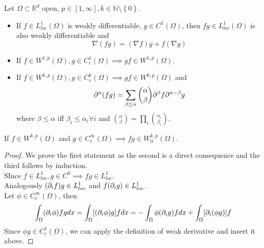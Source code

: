 \documentclass[../main.tex]{subfiles}
\begin{document}
\begin{lemma}
	Let $\Omega \subset \mathbb{R}^{d}$ open, $p \in [ 1, \infty ], k \in \mathbb{N}\setminus \left\{ 0 \right\}$.
	\begin{itemize}
	\item If $f\in L^{1}_{loc} ( \Omega) $ is weakly differentiable, $g \in C^{1}( \Omega) $, then $fg \in L^{1}_{loc} ( \Omega) $ is also weakly differentiable and 
		\[ 
		\nabla( fg) = ( \nabla f) g + f ( \nabla g) 
		\]

	\item If $f\in W^{1,p}( \Omega) , g \in C^{1}_c( \Omega) \implies gf \in W^{1,p}( \Omega) $.
	\item If $f \in W^{k,p}( \Omega) , g \in C^{k}_c( \Omega) \implies gf \in W^{k,p}( \Omega) $ and 
		\[ 
			\partial^{\alpha}( fg) = \sum_{\beta \leq \alpha}^{ } \binom{\alpha}{\beta} \partial^{\beta}f \partial^{\alpha-\beta}g
		\]
		where $\beta \leq \alpha$ iff $\beta_i \leq \alpha_i\forall i$ and $ \binom{\alpha}{\beta} = \prod_i \binom{\alpha_i}{\beta_i}$.
	\end{itemize}
\end{lemma}
\begin{rmq}
If $f \in W^{k,p}( \Omega) $ and $g\in C^{ \infty }_c( \Omega) \implies fg \in W^{k,p}_0( \Omega) $.
\end{rmq}
\begin{proof}
We prove the first statement as the second is a direct consequence and the third follows by induction.\\
SInce $f \in L^{1}_{loc} , g \in C^{0}\implies fg \in L^{1}_{loc} $.\\
Analogously $( \partial_i f ) g \in L^{1}_{loc} $ and $f ( \partial_i g) \in L^{1}_{loc}  $.\\
Let $\phi \in C^{ \infty }_c ( \Omega) $, then
\[ 
\int_{ \Omega }^{  } ( \partial_i \phi)  fg dx = \int_{ \Omega }^{  } [  ( \partial_i \phi) g ] f dx =- \int_{ \Omega }^{  } \phi ( \partial_i g ) f dx + \int_{ \Omega }^{  } [  \partial_i( \phi g) ] f
\]
Since $\phi g \in C^{1}_c( \Omega) $, we can apply the definition of weak derivative and insert it above.

\end{proof}
\end{document}
